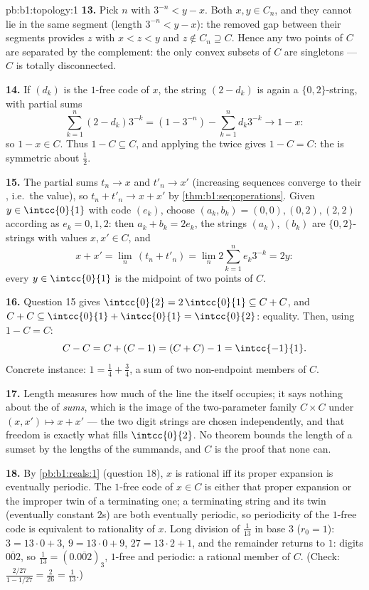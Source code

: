 \begin{solution}{pb:b1:topology:1}
\textbf{13.} Pick $n$ with $3^{-n} < y - x$. Both $x, y \in
C_n$, and they cannot lie in the same segment (length $3^{-n} <
y - x$): the removed gap between their segments provides $z$
with $x < z < y$ and $z \notin C_n \supseteq C$. Hence any two
points of $C$ are separated by the complement: the only convex
subsets of $C$ are singletons --- $C$ is totally disconnected.

\textbf{14.} If $(d_k)$ is the $1$-free code of $x$, the string
$(2 - d_k)$ is again a $\{0,2\}$-string, with partial sums
\[
\sum_{k=1}^{n} (2 - d_k)3^{-k} = (1 - 3^{-n}) - \sum_{k=1}^n
d_k 3^{-k} \longrightarrow 1 - x :
\]
so $1 - x \in C$. Thus $1 - C \subseteq C$, and applying the 
twice gives $1 - C = C$: the  is symmetric about
$\frac12$.

\textbf{15.} The partial sums $t_n \to x$ and $t'_n \to x'$
(increasing sequences converge to their , i.e.\ the
value), so $t_n + t'_n \to x + x'$ by
\cref{thm:b1:seq:operations}. Given $y \in \intcc{0}{1}$ with
code $(e_k)$, choose $(a_k, b_k) = (0,0), (0,2), (2,2)$
according as $e_k = 0, 1, 2$: then $a_k + b_k = 2e_k$, the
strings $(a_k)$, $(b_k)$ are $\{0,2\}$-strings with values $x,
x' \in C$, and
\[
x + x' = \lim_n\,(t_n + t'_n) = \lim_n 2\sum_{k=1}^n e_k 3^{-k}
= 2y :
\]
every $y \in \intcc{0}{1}$ is the midpoint of two points of $C$.

\textbf{16.} Question 15 gives $\intcc{0}{2} = 2\,\intcc{0}{1}
\subseteq C + C$, and $C + C \subseteq \intcc{0}{1} +
\intcc{0}{1} = \intcc{0}{2}$: equality. Then, using $1 - C = C$:
\[
C - C = C + (C - 1) = (C + C) - 1 = \intcc{-1}{1} .
\]
Concrete instance: $1 = \frac14 + \frac34$, a sum of two
non-endpoint members of $C$.

\textbf{17.} Length measures how much of the line the  itself
occupies; it says nothing about the  of \emph{sums}, which is
the image of the two-parameter family $C \times C$ under $(x,
x') \mapsto x + x'$ --- the two digit strings are chosen
independently, and that freedom is exactly what fills
$\intcc{0}{2}$. No theorem bounds the length of a sumset by the
lengths of the summands, and $C$ is the proof that none can.

\textbf{18.} By \cref{pb:b1:reals:1} (question 18), $x$ is
rational iff its proper expansion is eventually periodic. The
$1$-free code of $x \in C$ is either that proper expansion or
the improper twin of a terminating one; a terminating string and
its twin (eventually constant $2$s) are both eventually
periodic, so periodicity of the $1$-free code is equivalent to
rationality of $x$. Long division of $\frac1{13}$ in base $3$
($r_0 = 1$): $3 = 13\cdot0 + 3$, $9 = 13\cdot0 + 9$, $27 =
13\cdot2 + 1$, and the remainder returns to $1$: digits
$\overline{002}$, so $\frac1{13} = (0.\overline{002})_3$,
$1$-free and periodic: a rational member of $C$. (Check:
$\frac{2/27}{1 - 1/27} = \frac{2}{26} = \frac1{13}$.)


\end{solution}
